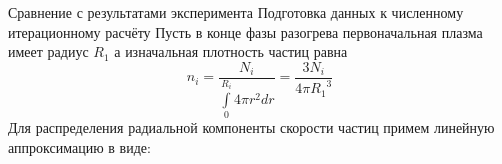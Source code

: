﻿\documentclass{article}
\begin{document}
Сравнение с результатами эксперимента
Подготовка данных к численному итерационному расчёту
Пусть в конце фазы разогрева первоначальная плазма имеет радиус ${{R}_{1}}$ а изначальная плотность частиц равна   \[{{n}_{i}}=\frac{{{N}_{i}}}{\int\limits_{0}^{{{R}_{i}}}{4\pi {{r}^{2}}dr}}=\frac{3{{N}_{i}}}{4\pi {{R}_{1}}^{3}}\]  Для распределения радиальной компоненты скорости частиц примем линейную аппроксимацию в виде: 
\end{document}
